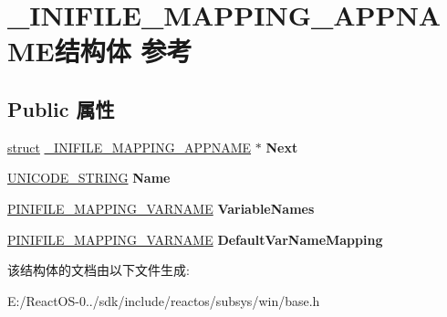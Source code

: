 \hypertarget{struct___i_n_i_f_i_l_e___m_a_p_p_i_n_g___a_p_p_n_a_m_e}{}\section{\+\_\+\+I\+N\+I\+F\+I\+L\+E\+\_\+\+M\+A\+P\+P\+I\+N\+G\+\_\+\+A\+P\+P\+N\+A\+M\+E结构体 参考}
\label{struct___i_n_i_f_i_l_e___m_a_p_p_i_n_g___a_p_p_n_a_m_e}
\subsection*{Public 属性}
\begin{DoxyCompactItemize}
\item 
\mbox{\label{struct___i_n_i_f_i_l_e___m_a_p_p_i_n_g___a_p_p_n_a_m_e_a327557c36d7e6f2d6998b46e4ed18d1a}} 
\hyperlink{interfacestruct}{struct} \hyperlink{struct___i_n_i_f_i_l_e___m_a_p_p_i_n_g___a_p_p_n_a_m_e}{\+\_\+\+I\+N\+I\+F\+I\+L\+E\+\_\+\+M\+A\+P\+P\+I\+N\+G\+\_\+\+A\+P\+P\+N\+A\+ME} $\ast$ {\bfseries Next}
\item 
\mbox{\label{struct___i_n_i_f_i_l_e___m_a_p_p_i_n_g___a_p_p_n_a_m_e_a16d8309df73eb43dd3d1157888446d9e}} 
\hyperlink{struct___u_n_i_c_o_d_e___s_t_r_i_n_g}{U\+N\+I\+C\+O\+D\+E\+\_\+\+S\+T\+R\+I\+NG} {\bfseries Name}
\item 
\mbox{\label{struct___i_n_i_f_i_l_e___m_a_p_p_i_n_g___a_p_p_n_a_m_e_a06adc8d93e3e2c2acc378404da132261}} 
\hyperlink{struct___i_n_i_f_i_l_e___m_a_p_p_i_n_g___v_a_r_n_a_m_e}{P\+I\+N\+I\+F\+I\+L\+E\+\_\+\+M\+A\+P\+P\+I\+N\+G\+\_\+\+V\+A\+R\+N\+A\+ME} {\bfseries Variable\+Names}
\item 
\mbox{\label{struct___i_n_i_f_i_l_e___m_a_p_p_i_n_g___a_p_p_n_a_m_e_a258fc6dee29785f3e34ce90b23cbaf0e}} 
\hyperlink{struct___i_n_i_f_i_l_e___m_a_p_p_i_n_g___v_a_r_n_a_m_e}{P\+I\+N\+I\+F\+I\+L\+E\+\_\+\+M\+A\+P\+P\+I\+N\+G\+\_\+\+V\+A\+R\+N\+A\+ME} {\bfseries Default\+Var\+Name\+Mapping}
\end{DoxyCompactItemize}


该结构体的文档由以下文件生成\+:\begin{DoxyCompactItemize}
\item 
E\+:/\+React\+O\+S-\/0../sdk/include/reactos/subsys/win/base.\+h\end{DoxyCompactItemize}
